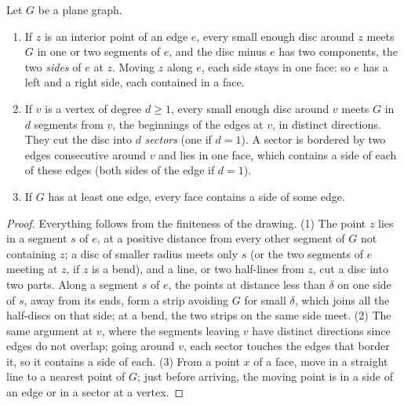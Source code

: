 \begin{lemma}\label{lem:local}
Let $G$ be a plane graph.
\begin{enumerate}
\item If $z$ is an interior point of an edge $e$, every small enough disc around $z$ meets $G$ in one or two segments of $e$, and the disc
minus $e$ has two components, the two \emph{sides} of $e$ at $z$. Moving $z$ along $e$, each side stays in one face: so $e$ has a left and a right
side, each contained in a face.
\item If $v$ is a vertex of degree $d\ge1$, every small enough disc around $v$ meets $G$ in $d$ segments from $v$, the beginnings of the edges at $v$, in
distinct directions. They cut the disc into $d$ \emph{sectors} (one if $d=1$). A sector is bordered by two edges consecutive around $v$ and lies in one
face, which contains a side of each of these edges (both sides of the edge if $d=1$).
\item If $G$ has at least one edge, every face contains a side of some edge.
\end{enumerate}
\end{lemma}
\begin{proof}
Everything follows from the finiteness of the drawing. (1) The point $z$ lies in a segment $s$ of $e$, at a positive distance from every
other segment of $G$ not containing $z$; a disc of smaller radius meets only $s$ (or the two segments of $e$ meeting at $z$, if $z$ is a bend),
and a line, or two half-lines from $z$, cut a disc into two parts. Along a segment $s$ of $e$, the points at distance less than $\delta$ on one side of
$s$, away from its ends, form a strip avoiding $G$ for small $\delta$, which joins all the half-discs on that side; at a bend, the two strips
on the same side meet. (2) The same argument at $v$, where the segments leaving $v$ have distinct directions since edges do not overlap; going
around $v$, each sector touches the edges that border it, so it contains a side of each. (3) From a point $x$ of a face, move in a straight
line to a nearest point of $G$; just before arriving, the moving point is in a side of an edge or in a sector at a vertex.
\end{proof}

